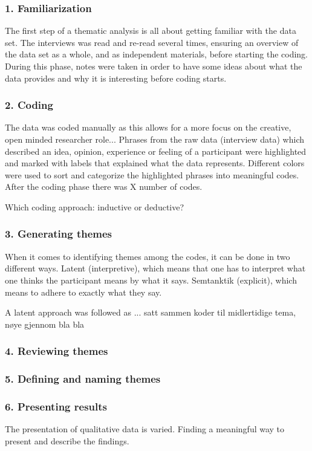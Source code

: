     \subsubsection{1. Familiarization}
    The first step of a thematic analysis is all about getting familiar with the data set. The interviews was read and re-read several times, ensuring an overview of the data set as a whole, and as independent materials, before starting the coding. During this phase, notes were taken in order to have some ideas about what the data provides and why it is interesting before coding starts. 
    
    \subsubsection{2. Coding}
    The data was coded manually as this allows for a more focus on the creative, open minded researcher role... Phrases from the raw data (interview data) which described an idea, opinion, experience or feeling of a participant were highlighted and marked with labels that explained what the data represents. Different colors were used to sort and categorize the highlighted phrases into meaningful codes. After the coding phase there was X number of codes. 
    
    Which coding approach: inductive or deductive? 
    
    \subsubsection{3. Generating themes}
    When it comes to identifying themes among the codes, it can be done in two different ways. Latent (interpretive), which means that one has to interpret what one thinks the participant means by what it says. Semtanktik (explicit), which means to adhere to exactly what they say. 
    
    A latent approach was followed as ...
    satt sammen koder til midlertidige tema, nøye gjennom bla bla 

    \subsubsection{4. Reviewing themes}
    \subsubsection{5. Defining and naming themes}
    
    \subsubsection{6. Presenting results}
    The presentation of qualitative data is varied. 
    Finding a meaningful way to present and describe the findings. 

